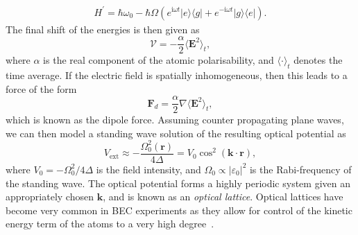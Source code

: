 \begin{align}
 H^{'} = \hbar\omega_0 - \hbar\Omega\left(e^{\textrm{i}\omega t}|e\rangle\langle g|   + e^{-\textrm{i}\omega t}|g\rangle\langle e|  \right).
\end{align}
The final shift of the energies is then given as
\begin{equation}\label{eqn:acshift}
\mathcal{V} = -\frac{\alpha}{2}\langle \mathbf{E}^2\rangle_t ,
\end{equation}
where $\alpha$ is the real component of the atomic polarisability, and $\langle \cdot \rangle_t$ denotes the time average. If the electric field is spatially inhomogeneous, then this leads to a force of the form
\begin{equation}
\mathbf{F}_d = \frac{\alpha}{2}\nabla\langle \mathbf{E}^2 \rangle_t ,
\end{equation}
which is known as the dipole force. Assuming counter propagating plane waves, we can then model a standing wave solution of the resulting optical potential as
\begin{equation}
    V_{\textrm{ext}} \approx -\frac{\Omega_0^2(\mathbf{r})}{4\Delta}  = V_0 \cos^2 (\mathbf{k} \cdot \mathbf{r}),
\end{equation}
where $V_0 = -\Omega_0^2/4\Delta$ is the field intensity, and $\Omega_0 \propto |\varepsilon_0|^2$ is the Rabi-frequency of the standing wave. The optical potential forms a highly periodic system given an appropriately chosen $\mathbf{k}$, and is known as an \textit{optical lattice}. Optical lattices have become very common in BEC experiments as they allow for control of the kinetic energy term of the atoms to a very high degree~\cite{OL:Greiner_nat_2002,OL:Reijnders_prl_2004,OL:Sorensen_prl_2005,Vtx:Tung_prl_2006,Vtx:Vignolo_pra_2007,BEC:Watanabe_entropy_2016}.

